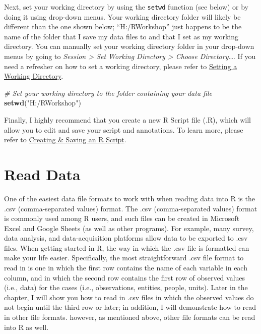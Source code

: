 \documentclass[]{book}
\newenvironment{Shaded}{\begin{snugshade}}{\end{snugshade}}
\newcommand{\KeywordTok}[1]{\textcolor[rgb]{0.13,0.29,0.53}{\textbf{#1}}}
\newcommand{\StringTok}[1]{\textcolor[rgb]{0.31,0.60,0.02}{#1}}
\newcommand{\CommentTok}[1]{\textcolor[rgb]{0.56,0.35,0.01}{\textit{#1}}}
\newcommand{\NormalTok}[1]{#1}
\begin{document}
Next, set your working directory by using the \texttt{setwd} function
(see below) or by doing it using drop-down menus. Your working directory
folder will likely be different than the one shown below;
``H:/RWorkshop'' just happens to be the name of the folder that I save
my data files to and that I set as my working directory. You can
manually set your working directory folder in your drop-down menus by
going to \emph{Session \textgreater{} Set Working Directory
\textgreater{} Choose Directory\ldots{}}. If you need a refresher on how
to set a working directory, please refer to
\protect\hyperlink{setwd}{Setting a Working Directory}.

\begin{Shaded}
\begin{Highlighting}[]
\CommentTok{# Set your working directory to the folder containing your data file}
\KeywordTok{setwd}\NormalTok{(}\StringTok{"H:/RWorkshop"}\NormalTok{)}
\end{Highlighting}
\end{Shaded}

Finally, I highly recommend that you create a new R Script file (.R),
which will allow you to edit and save your script and annotations. To
learn more, please refer to \protect\hyperlink{createRscript}{Creating
\& Saving an R Script}.

\section{Read Data}\label{read-data}

One of the easiest data file formats to work with when reading data into
R is the .csv (comma-separated values) format. The .csv (comma-separated
values) format is commonly used among R users, and such files can be
created in Microsoft Excel and Google Sheets (as well as other
programs). For example, many survey, data analysis, and data-acquisition
platforms allow data to be exported to .csv files. When getting started
in R, the way in which the .csv file is formatted can make your life
easier. Specifically, the most straightforward .csv file format to read
in is one in which the first row contains the name of each variable in
each column, and in which the second row contains the first row of
observed values (i.e., data) for the cases (i.e., observations,
entities, people, units). Later in the chapter, I will show you how to
read in .csv files in which the observed values do not begin until the
third row or later; in addition, I will demonstrate how to read in other
file formats. however, as mentioned above, other file formats can be
read into R as well.
\end{document}
